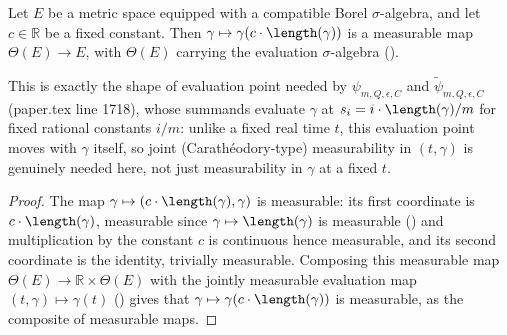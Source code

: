 \begin{helper}
  Let $E$ be a metric space equipped with a compatible Borel $\sigma$-algebra, and let
  $c \in \mathbb{R}$ be a fixed constant. Then $\gamma \mapsto \gamma(c \cdot \length(\gamma))$ is a
  measurable map $\Theta(E) \to E$, with $\Theta(E)$ carrying the evaluation $\sigma$-algebra
  ().

  This is exactly the shape of evaluation point needed by $\psi_{m,Q,\epsilon,C}$ and
  $\tilde\psi_{m,Q,\epsilon,C}$ (paper.tex line 1718), whose summands evaluate $\gamma$ at
  $s_i = i\cdot\length(\gamma)/m$ for fixed rational constants $i/m$: unlike a fixed real time $t$,
  this evaluation point moves with $\gamma$ itself, so joint (Carath\'eodory-type) measurability in
  $(t,\gamma)$ is genuinely needed here, not just measurability in $\gamma$ at a fixed $t$.
\end{helper}
\begin{proof}
  The map $\gamma \mapsto (c \cdot \length(\gamma), \gamma)$ is measurable: its first coordinate is
  $c \cdot \length(\gamma)$, measurable since $\gamma \mapsto \length(\gamma)$ is measurable
  () and multiplication by the constant $c$ is continuous hence
  measurable, and its second coordinate is the identity, trivially measurable. Composing this
  measurable map $\Theta(E) \to \mathbb{R} \times \Theta(E)$ with the jointly measurable evaluation
  map $(t,\gamma) \mapsto \gamma(t)$ () gives that
  $\gamma \mapsto \gamma(c \cdot \length(\gamma))$ is measurable, as the composite of measurable
  maps.
\end{proof}
